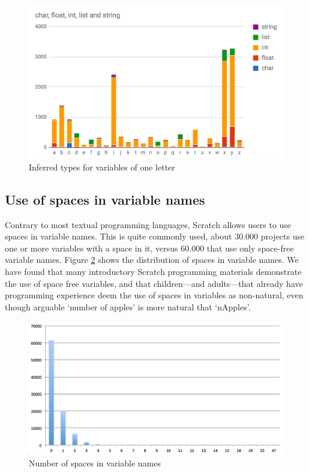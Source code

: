 \documentclass[conference]{IEEEtran}
\begin{document}
\begin{figure}
	\begin{center}
		\includegraphics[width=\columnwidth]{fig/one_letter_type}
		\caption{Inferred types for variables of one letter}
		\label{fig:one_letter_type}
	\end{center}
\end{figure} 

\subsection{Use of spaces in variable names}

Contrary to most textual programming languages, Scratch allows users to use spaces in variable names. This is quite commonly used, about 30.000 projects use one or more variables with a space in it, versus 60.000 that use only space-free variable names. Figure \ref{fig:number_of_spaces} shows the distribution of spaces in variable names. We have found that many introductory Scratch programming materials demonstrate the use of space free variables, and that children---and adults---that already have programming experience deem the use of spaces in variables as non-natural, even though arguable `number of apples' is more natural that `nApples'.

\begin{figure}
	\begin{center}
		\includegraphics[width=\columnwidth]{fig/number_of_spaces}
		\caption{Number of spaces in variable names}
		\label{fig:number_of_spaces}
	\end{center}
\end{figure} 
\end{document}
